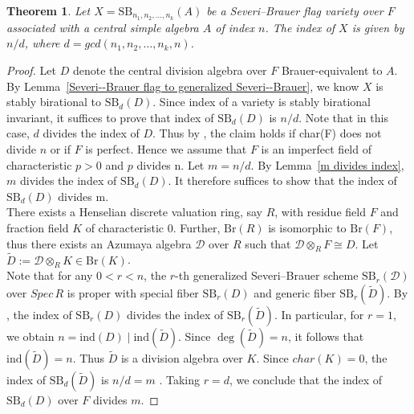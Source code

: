 \documentclass[10pt]{amsart}
\theoremstyle{plain}
\newtheorem{theorem}[thm]{Theorem}
\theoremstyle{definition}
\newcommand{\Br}{\text{Br}}
\begin{document}
\begin{theorem}\label{index of generalized SB}
Let \(X = \mathrm{SB}_{n_1,n_2,\dots,n_k}(A)\) be a Severi--Brauer flag variety over \(F\) associated with a central simple algebra \(A\) of index \(n\). The index of \(X\) is given by \(n/d\), where \(d=gcd(n_1,n_2,\dots,n_k,n)\).
\end{theorem} 

\begin{proof}
Let \(D\) denote the central division algebra over \(F\) Brauer-equivalent to \(A\). By Lemma~\ref{Severi--Brauer flag to generalized Severi--Brauer}, we know \(X\) is stably birational to \(\mathrm{SB}_d(D)\). Since index of a variety is stably birational invariant, it suffices to prove that index of \(\mathrm{SB}_d(D)\) is \(n/d\). Note that in this case, \(d\) divides the index of \(D\). Thus by \cite[Theorem 7.1]{zerocycle}, the claim holds if char(F) does not divide \(n\) or if \(F\) is perfect. Hence we assume that \(F\) is an imperfect field of characteristic \(p > 0\) and \(p\) divides n. Let \(m = n/d\). By Lemma~\ref{m divides index}, \(m\) divides the index of \(\mathrm{SB}_d(D)\). It therefore suffices to show that the index of \(\mathrm{SB}_d(D)\) divides m. \\
There exists a Henselian discrete valuation ring, say \(R\), with residue field \(F\) and fraction field \(K\) of characteristic \(0\). Further, \(\Br(R)\) is isomorphic to \(\Br(F)\), thus there exists an Azumaya algebra \(\mathcal{D}\) over \(R\) such that \(\mathcal{D} \otimes_R F \cong D\). Let \(\tilde{D}:= \mathcal{D}\otimes_R K \in \Br(K)\).\\
Note that for any \(0 < r < n\), the \(r\)-th generalized Severi--Brauer scheme \(\mathrm{SB}_r(\mathcal{D})\) over \(Spec \, R\) is proper with special fiber \(\mathrm{SB}_r(D)\) and generic fiber \(\mathrm{SB}_r(\tilde{D})\). By \cite[Lemma~2.10]{CT}, the index of  \(\mathrm{SB}_r(D)\) divides the index of \(\mathrm{SB}_r(\tilde{D})\). In particular, for \(r=1\), we obtain \(n = \mathrm{ind}(D) \mid \mathrm{ind}(\tilde{D})\). Since \(\deg(\tilde{D})=n\), it follows that \(\mathrm{ind}(\tilde{D})=n\). Thus \(\tilde{D}\) is a division algebra over \(K\). Since \(char(K)=0\), the index of \(\mathrm{SB}_d(\tilde{D})\) is \(n/d= m\) \cite[Lemma 7.1]{zerocycle}. Taking \(r=d\), we conclude that the index of \(\mathrm{SB}_d(D)\) over \(F\) divides \(m\).      
\end{proof}
\end{document}
